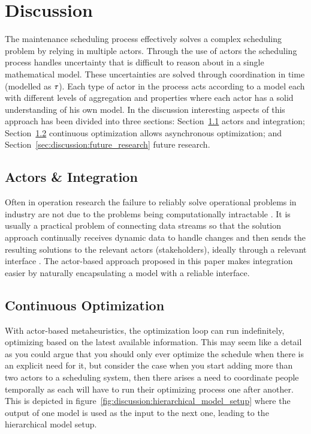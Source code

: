 \section{Discussion}\label{sec:4-discussion}
The maintenance scheduling process effectively solves a complex scheduling
problem by relying in multiple actors. Through the use of actors the scheduling
process handles uncertainty that is difficult to reason about in a single
mathematical model. These  uncertainties are solved through coordination in
time (modelled as $\tau$). Each type of actor in the process acts
according to a model each with different levels of aggregation and properties
where each actor has a solid understanding of his own model. In the discussion
interesting aspects of this approach has been divided into three 
sections: Section~\ref{sec:discussion:actors_and_integration}
actors and integration; Section~\ref{sec:discussion:continuous_optimization}
continuous optimization allows asynchronous optimization;  and
Section~\ref{sec:discussion:future_research} future research.

\subsection{Actors \& Integration}\label{sec:discussion:actors_and_integration}
Often in operation research the failure to reliably solve operational
problems in industry are not due to the problems being computationally
intractable \citep{gendreauHandbookMetaheuristics2019}. It is usually a practical
problem of connecting data streams so that the solution approach continually
receives dynamic data to handle changes and then sends the resulting
solutions to the relevant actors (stakeholders), ideally through a relevant interface
\citep{meignanReviewTaxonomyInteractive2015}. The actor-based approach proposed
in this paper makes integration easier by naturally encapsulating a model with a
reliable interface.

\subsection{Continuous Optimization}\label{sec:discussion:continuous_optimization}
With actor-based metaheuristics, the optimization loop can run indefinitely,
optimizing based on the latest available information. This may seem like a
detail as you could argue that you should only ever optimize the schedule
when there is an explicit need for it, but consider the case when you start
adding more than two actors to a scheduling system, then there arises a need
to coordinate people temporally as each will have to run their optimizing
process one after another. This is depicted in figure~\ref{fig:discussion:hierarchical_model_setup}
where the output of one model is used as the input to the next one, leading
to the hierarchical model setup.

